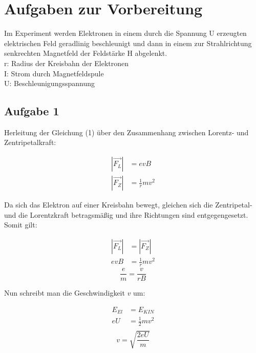 \documentclass[a4paper,10pt]{scrartcl}
\begin{document}
	\newpage
	
	\section{Aufgaben zur Vorbereitung}
	
	Im Experiment werden Elektronen in einem durch die Spannung U erzeugten elektrischen Feld geradlinig beschleunigt und dann in einem zur Strahlrichtung senkrechten Magnetfeld der Feldstärke H abgelenkt.\\
	r: Radius der Kreisbahn der Elektronen\\
	I: Strom durch Magnetfeldspule\\
	U: Beschleunigungsspannung\\
	
	\subsection{Aufgabe 1}
	
	Herleitung der Gleichung (1) über den Zusammenhang zwischen Lorentz- und Zentripetalkraft:
	
	\begin{equation*}
	\begin{aligned}
	|\vec{F_{L}}|&=evB\\
	|\vec{F_{Z}}|&=\frac{1}{r}mv^2
	\end{aligned}
	\end{equation*}
	
    Da sich das Elektron auf einer Kreisbahn bewegt, gleichen sich die Zentripetal- und die Lorentzkraft betragsmäßig und ihre Richtungen sind entgegengesetzt. Somit gilt:
   
	\begin{equation*}
	\begin{aligned}
    |\vec{F_{L}}|&=|\vec{F_{Z}}|\\
	evB&=\frac{1}{r}mv^2
	\end{aligned}
	\end{equation*}
	\begin{equation}
	\frac{e}{m}=\frac{v}{rB}
	\end{equation}
	
	Nun schreibt man die Geschwindigkeit $v$ um:
	
	\begin{equation*}
	\begin{aligned}
	E_{El}&=E_{KIN}\\	
	eU&=\frac{1}{2}mv^2\\
	\end{aligned}
	\end{equation*}
	\begin{equation}
	v=\sqrt{\frac{2eU}{m}}
	\end{equation}
	
\end{document}
